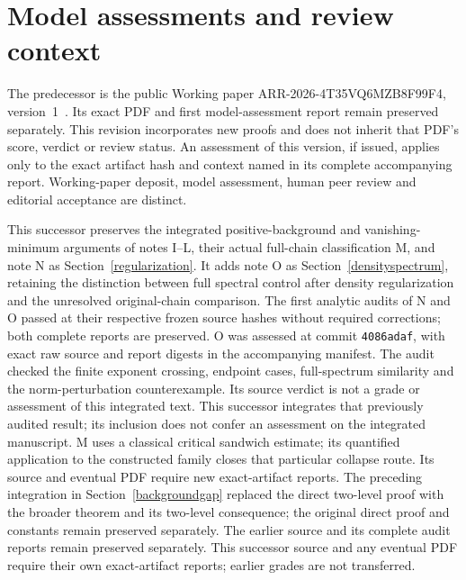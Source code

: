 \documentclass[11pt]{article}
\begin{document}
\section{Model assessments and review context}
The predecessor is the public Working paper ARR-2026-4T35VQ6MZB8F99F4, version~1~\cite{predecessor}. Its exact PDF and first model-assessment report remain preserved separately. This revision incorporates new proofs and does not inherit that PDF's score, verdict or review status. An assessment of this version, if issued, applies only to the exact artifact hash and context named in its complete accompanying report. Working-paper deposit, model assessment, human peer review and editorial acceptance are distinct.

This successor preserves the integrated positive-background and vanishing-minimum arguments of notes I--L, their actual full-chain classification M, and note N as Section~\ref{regularization}. It adds note O as Section~\ref{densityspectrum}, retaining the distinction between full spectral control after density regularization and the unresolved original-chain comparison. The first analytic audits of N and O passed at their respective frozen source hashes without required corrections; both complete reports are preserved. O was assessed at commit \texttt{4086adaf}, with exact raw source and report digests in the accompanying manifest. The audit checked the finite exponent crossing, endpoint cases, full-spectrum similarity and the norm-perturbation counterexample. Its source verdict is not a grade or assessment of this integrated text. This successor integrates that previously audited result; its inclusion does not confer an assessment on the integrated manuscript. M uses a classical critical sandwich estimate; its quantified application to the constructed family closes that particular collapse route. Its source and eventual PDF require new exact-artifact reports. The preceding integration in Section~\ref{backgroundgap} replaced the direct two-level proof with the broader theorem and its two-level consequence; the original direct proof and constants remain preserved separately. The earlier source and its complete audit reports remain preserved separately. This successor source and any eventual PDF require their own exact-artifact reports; earlier grades are not transferred.
\end{document}
